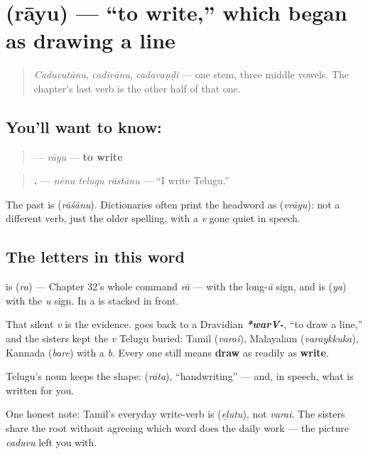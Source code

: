 \section[\texorpdfstring{\te{రాయు} (rāyu)}{రాయు (rāyu)}]{ (rāyu) — \textquotedblleft{}to write,\textquotedblright{} which began as drawing a line}

\label{lesson:TE-C33-raayu}



\begin{quote}
\emph{Caduvutānu}, \emph{cadivānu}, \emph{cadavaṇḍi} — one stem, three middle vowels. The chapter's last verb is the other half of that one.
\end{quote}

\subsection*{You'll want to know: }
\begin{quote}
\textbf{} — \emph{rāyu} — \textbf{to write}
\end{quote}

\begin{quote}
\textbf{  .} — \emph{nēnu telugu rāstānu} — \textquotedblleft{}I write Telugu.\textquotedblright{}
\end{quote}

The past is \textbf{} (\emph{rāśānu}). Dictionaries often print the headword as \textbf{} (\emph{vrāyu}): not a different verb, just the older spelling, with a \emph{v} gone quiet in speech.

\subsection*{The letters in this word}
\textbf{} is \textbf{} (\emph{ra}) — Chapter 32's whole command \emph{rā} — with the long-\emph{ā} sign, and \textbf{} is \textbf{} (\emph{ya}) with the \emph{u} sign. In \textbf{} a \textbf{} is stacked in front.

\begin{cousinweb}
That silent \emph{v} is the evidence. \textbf{} goes back to a Dravidian \emph{\textbf{*warV-}}, \textquotedblleft{}to draw a line,\textquotedblright{} and the sisters kept the \emph{v} Telugu buried: Tamil \textbf{} (\emph{varai}), Malayalam \textbf{} (\emph{varaykkuka}), Kannada \textbf{} (\emph{bare}) with a \emph{b}. Every one still means \textbf{draw} as readily as \textbf{write}.

Telugu's noun keeps the shape: \textbf{} (\emph{rāta}), \textquotedblleft{}handwriting\textquotedblright{} — and, in speech, what is written for you.

One honest note: Tamil's everyday write-verb is \textbf{} (\emph{eḻutu}), not \emph{varai}. The sisters share the root without agreeing which word does the daily work — the picture \emph{caduvu} left you with.
\end{cousinweb}

